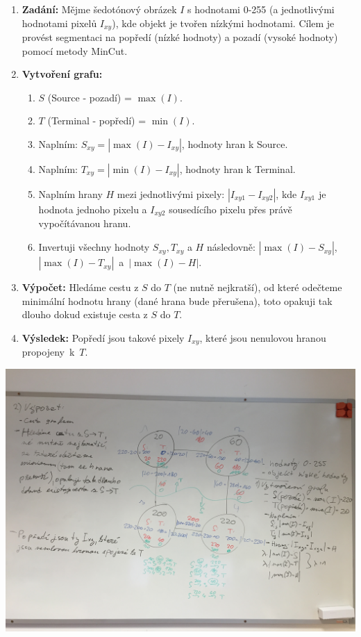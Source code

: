 \documentclass[12pt, a4paper]{article}
\begin{document}
\begin{enumerate}
	\item \textbf{Zadání:} Mějme šedotónový obrázek $I$ s hodnotami 0-255 (a jednotlivými hodnotami pixelů $I_{xy}$), kde objekt je tvořen nízkými hodnotami. Cílem je provést segmentaci na popředí (nízké hodnoty) a pozadí (vysoké hodnoty) pomocí metody MinCut.
	\item \textbf{Vytvoření grafu:} 
		\begin{enumerate}
			\item $S$ (Source - pozadí) = $\max \left( I \right)$.
			\item $T$ (Terminal - popředí) = $\min \left( I \right)$.
			\item Naplním: $S_{xy} = \left| \max \left( I \right) - I_{xy}  \right|$, hodnoty hran k Source.
			\item Naplním: $T_{xy} = \left| \min \left( I \right) - I_{xy}  \right|$, hodnoty hran k Terminal.
			\item Naplním hrany $H$ mezi jednotlivými pixely: $\left| I_{xy1} - I_{xy2}  \right|$, kde $I_{xy1}$ je hodnota jednoho pixelu a $I_{xy2}$ sousedícího pixelu přes právě vypočítávanou hranu.
			\item Invertuji všechny hodnoty $S_{xy}, T_{xy}$ a $H$ následovně: $\left| \max \left( I \right) - S_{xy}  \right|$, \\ $\left| \max \left( I \right) - T_{xy}  \right|$~a~$\left| \max \left( I \right) - H  \right|$.
		\end{enumerate}
	\item \textbf{Výpočet:} Hledáme cestu z $S$ do $T$ (ne nutně nejkratší), od které odečteme minimální hodnotu hrany (dané hrana bude přerušena), toto opakuji tak dlouho dokud existuje cesta z $S$ do $T$.
	\item \textbf{Výsledek:} Popředí jsou takové pixely $I_{xy}$, které jsou nenulovou hranou propojeny~k~$T$.\\
\end{enumerate}
\includegraphics[width=\textwidth]{tabule.JPG}
\end{document}
